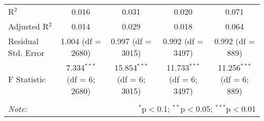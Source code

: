 \begin{table}[!htbp]
\begin{tabular}{@{\extracolsep{5pt}}lcccc}
R$^{2}$ & 0.016 & 0.031 & 0.020 & 0.071 \\ 
Adjusted R$^{2}$ & 0.014 & 0.029 & 0.018 & 0.064 \\ 
Residual Std. Error & 1.004 (df = 2680) & 0.997 (df = 3015) & 0.992 (df = 3497) & 0.992 (df = 889) \\ 
F Statistic & 7.334$^{***}$ (df = 6; 2680) & 15.854$^{***}$ (df = 6; 3015) & 11.733$^{***}$ (df = 6; 3497) & 11.256$^{***}$ (df = 6; 889) \\ 
\hline 
\hline \\[-1.8ex] 
\textit{Note:}  & \multicolumn{4}{r}{$^{*}$p$<$0.1; $^{**}$p$<$0.05; $^{***}$p$<$0.01} \\ 
\end{tabular} 
\end{table} 
